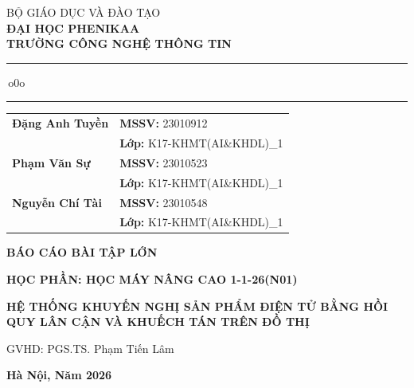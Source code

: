 \documentclass[12pt,a4paper]{article}
\theoremstyle{plain} %
\theoremstyle{plain} %
\theoremstyle{plain} %
\theoremstyle{nonumberplain}  %
\numberwithin{equation}{section}
\numberwithin{figure}{section}
\numberwithin{table}{section}
\begin{document}
\begin{titlepage}
\thispagestyle{empty}
\thisfancypage{\setlength{\fboxsep}{0.2cm}\setlength{\fboxrule}{1pt}\doublebox}{}
\begin{center}
	\large
	BỘ GIÁO DỤC VÀ ĐÀO TẠO\\
	\textbf{ĐẠI HỌC PHENIKAA}\\
	\textbf{TRƯỜNG CÔNG NGHỆ THÔNG TIN}\\[0.15cm]
	\rule{4cm}{0.4pt}\,o0o\,\rule{4cm}{0.4pt}
\end{center}
\vspace{1.5cm}
\begin{center}
	\normalsize
	\renewcommand{\arraystretch}{1.15}
	\begin{tabular}{@{}p{5.2cm}l@{}}
        \textbf{Đặng Anh Tuyền} & \textbf{MSSV:} 23010912 \\
                                & \textbf{Lớp:} K17-KHMT(AI\&KHDL)\_1 \\[0.25cm]
        \textbf{Phạm Văn Sự} & \textbf{MSSV:} 23010523 \\
                                & \textbf{Lớp:} K17-KHMT(AI\&KHDL)\_1 \\[0.25cm]
        \textbf{Nguyễn Chí Tài} & \textbf{MSSV:} 23010548 \\
                                & \textbf{Lớp:} K17-KHMT(AI\&KHDL)\_1
	\end{tabular}
\end{center}
\vspace{1.3cm}
\begin{center}
    \bf\Large {BÁO CÁO BÀI TẬP LỚN}
\end{center}
\begin{center}
    \bf\large {HỌC PHẦN: HỌC MÁY NÂNG CAO 1-1-26(N01)}
\end{center}
\vspace{0.65cm}
\begin{center}
	\bf\Large HỆ THỐNG KHUYẾN NGHỊ SẢN PHẨM ĐIỆN TỬ BẰNG HỒI QUY LÂN CẬN VÀ KHUẾCH TÁN TRÊN ĐỒ THỊ
\end{center}
\vfill
\begin{center}
    GVHD: PGS.TS. Phạm Tiến Lâm
\end{center}
\vfill
\begin{center}
    {\large\textbf{Hà Nội, Năm 2026}}
\end{center}
\vspace{0.25cm}
\end{titlepage}
\end{document}
